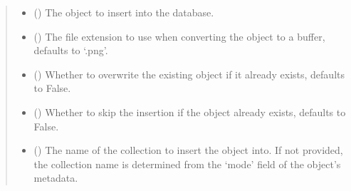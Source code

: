 \documentclass[letterpaper,10pt,english]{sphinxmanual}
\begin{document}
\begin{fulllineitems}
\begin{fulllineitems}
\begin{quote}
\begin{description}
\begin{itemize}
\item {} 
\sphinxAtStartPar
{} (\sphinxstyleliteralemphasis{\sphinxupquote{{[}}}\sphinxstyleliteralemphasis{\sphinxupquote{{]}}}) \textendash{} The object to insert into the database.

\item {} 
\sphinxAtStartPar
{} (\sphinxstyleliteralemphasis{\sphinxupquote{, }}) \textendash{} The file extension to use when converting the object to a buffer, defaults to ‘.png’.

\item {} 
\sphinxAtStartPar
{} (\sphinxstyleliteralemphasis{\sphinxupquote{, }}) \textendash{} Whether to overwrite the existing object if it already exists, defaults to False.

\item {} 
\sphinxAtStartPar
{} (\sphinxstyleliteralemphasis{\sphinxupquote{, }}) \textendash{} Whether to skip the insertion if the object already exists, defaults to False.

\item {} 
\sphinxAtStartPar
{} (\sphinxstyleliteralemphasis{\sphinxupquote{, }}) \textendash{} The name of the collection to insert the object into. If not provided, the collection
name is determined from the ‘mode’ field of the object’s metadata.

\end{itemize}


\end{description}
\end{quote}
\end{fulllineitems}
\end{fulllineitems}
\end{document}
